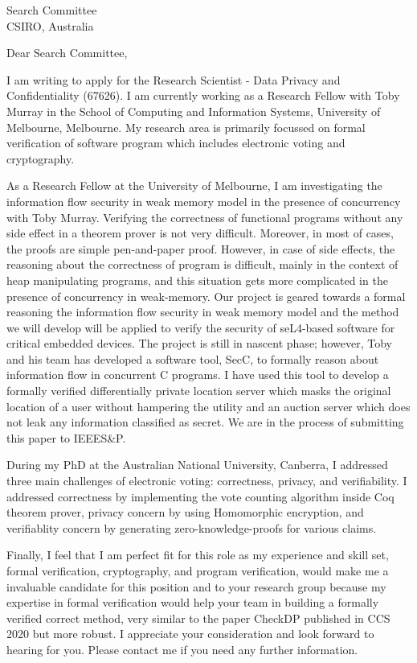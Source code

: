 \documentclass{letter}
\begin{document}
\begin{letter}{Search Committee\\
CSIRO, Australia}


\opening{Dear Search Committee,}


I am writing to apply for the Research Scientist - Data Privacy and Confidentiality (67626). 
I am currently working as a Research Fellow with Toby Murray in the School of Computing and Information Systems, University 
of Melbourne, Melbourne. My research area is primarily focussed on formal verification of software program  which includes 
electronic voting and cryptography. 

As a Research Fellow at the University of Melbourne, I am investigating the 
information flow security in weak memory model in the presence of concurrency with Toby Murray. 
Verifying the correctness of functional programs without any side effect in a theorem prover 
is not very difficult. Moreover, in most of cases, the proofs are simple pen-and-paper proof. 
However, in case of side effects, the reasoning about the correctness of program is
difficult, mainly in the context of heap manipulating programs, and this situation gets 
more complicated in the presence of concurrency in weak-memory. 
Our project is geared 
towards a formal reasoning the information flow security in weak memory model and 
the method we will develop will be applied to verify the security of seL4-based 
software for critical embedded devices.  The project is still in nascent phase; however, 
Toby and his team  has developed a software tool, SecC, to formally reason about information flow in 
concurrent C programs.  I have used this tool to develop a formally verified  differentially private location server
which masks the original location of a user without hampering the utility 
and an auction server which does not leak any information classified as secret.  We are in the process 
of submitting this paper to IEEES\&P.  

During my PhD at the Australian National University, Canberra,  I addressed three main challenges of
electronic voting: correctness, privacy, and verifiability.  I addressed correctness by implementing 
the vote counting algorithm inside Coq theorem prover, privacy concern by using Homomorphic 
encryption, and verifiablity concern by generating zero-knowledge-proofs for various claims.

Finally, I feel that I am perfect fit for this role as my experience and skill set, formal verification, cryptography,  and program verification,
would make me 
a invaluable candidate for this position and to your research group because my expertise  in formal verification would help your 
team in building a formally verified correct method,  very similar to the paper CheckDP published in CCS 2020 but more robust. 
I appreciate your consideration
and look forward to hearing for you.   Please contact me if you need any further information. 



\end{letter}
\end{document}
